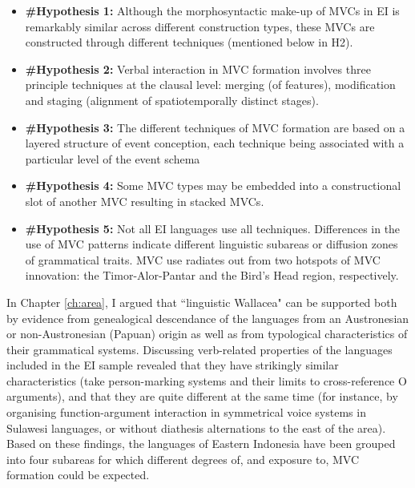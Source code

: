 \begin{footnotesize}
\begin{itemize}
\item \textbf{\#Hypothesis 1:} Although the morphosyntactic make-up of MVCs in EI is remarkably similar across different construction types, these MVCs are constructed through different techniques (mentioned below in H2).
\item \textbf{\#Hypothesis 2:} Verbal interaction in MVC formation involves three principle techniques at the clausal level: merging (of features), modification and staging (alignment of spatiotemporally distinct stages).
\item \textbf{\#Hypothesis 3:} The different techniques of MVC formation are based on a layered structure of event conception, each technique being associated with a particular level of the event schema
\item \textbf{\#Hypothesis 4:} Some MVC types may be embedded into a constructional slot of another MVC resulting in stacked MVCs.
\item \textbf{\#Hypothesis 5:} Not all EI languages use all techniques. Differences in the use of MVC patterns indicate different linguistic subareas or diffusion zones of grammatical traits. MVC use radiates out from two hotspots of MVC innovation: the Timor-Alor-Pantar and the Bird's Head region, respectively.
\end{itemize}
\end{footnotesize}

In Chapter \ref{ch:area}, I argued that ``linguistic Wallacea" can be supported both by evidence from genealogical descendance of the languages from an Austronesian or non-Austronesian (Papuan) origin as well as from typological characteristics of their grammatical systems. Discussing verb-related properties of the languages included in the EI sample revealed that they have strikingly similar characteristics (take person-marking systems and their limits to cross-reference O arguments), and that they are quite different at the same time (for instance, by organising function-argument interaction in symmetrical voice systems in Sulawesi languages, or without diathesis alternations to the east of the area). Based on these findings, the languages of Eastern Indonesia have been grouped into four subareas for which different degrees of, and exposure to, MVC formation could be expected.


